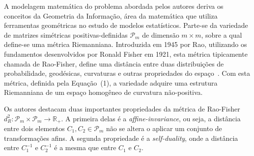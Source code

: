 \documentclass[a4paper,titlepage]{article}
\begin{document}
A modelagem matemática do problema abordada pelos autores deriva os conceitos
da Geometria da Informação, área da matemática que utiliza ferramentas
geométricas no estudo de modelos estatísticos. Parte-se da variedade de
matrizes simétricas positivas-definidas $\mathcal{P}_m$ de dimensão $m \times
m$, sobre a qual define-se uma métrica Riemanniana. Introduzida em 1945 por
Rao, utilizando os fundamentos desenvolvidos por Ronald Fisher em 1921, esta
métrica tipicamente chamada de Rao-Fisher, define uma distância entre duas
distribuições de probabilidade, geodésicas, curvaturas e outras propriedades do
espaço~\cite{porto2013geometria}. Com esta métrica, definida pela Equação~(1),
a variedade adquire uma estrutura Riemanniana de um espaço homogêneo de
curvatura não-positiva.

Os autores destacam duas importantes propriedades da métrica de Rao-Fisher
$d_R^2 : \mathcal{P}_m \times \mathcal{P}_m \rightarrow \mathbb{R}_+$. A
primeira delas é a \textit{affine-invariance}, ou seja, a distância entre dois
elementos $C_1, C_2 \in \mathcal{P}_m$ não se altera o aplicar um conjunto de
transformações afins. A segunda propriedade é a \textit{self-duality}, onde a
distância entre $C_1^{-1}$ e $C_2^{-1}$ é a mesma que entre $C_1$ e $C_2$.  

\begin{center}
  \vspace{1em}
  \vspace{1em}
\end{center}
\end{document}
